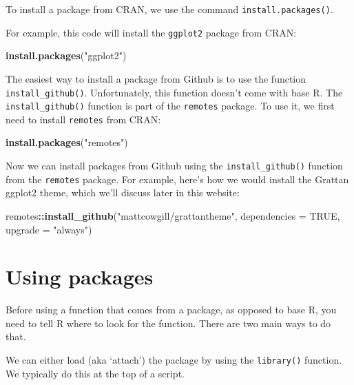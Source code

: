 \documentclass[]{book}
\newenvironment{Shaded}{\begin{snugshade}}{\end{snugshade}}
\newcommand{\DataTypeTok}[1]{\textcolor[rgb]{0.13,0.29,0.53}{#1}}
\newcommand{\KeywordTok}[1]{\textcolor[rgb]{0.13,0.29,0.53}{\textbf{#1}}}
\newcommand{\NormalTok}[1]{#1}
\newcommand{\OperatorTok}[1]{\textcolor[rgb]{0.81,0.36,0.00}{\textbf{#1}}}
\newcommand{\OtherTok}[1]{\textcolor[rgb]{0.56,0.35,0.01}{#1}}
\newcommand{\StringTok}[1]{\textcolor[rgb]{0.31,0.60,0.02}{#1}}
\begin{document}
To install a package from CRAN, we use the command \texttt{install.packages()}.

For example, this code will install the \texttt{ggplot2} package from CRAN:

\begin{Shaded}
\begin{Highlighting}[]
\KeywordTok{install.packages}\NormalTok{(}\StringTok{"ggplot2"}\NormalTok{)}
\end{Highlighting}
\end{Shaded}

The easiest way to install a package from Github is to use the function \texttt{install\_github()}. Unfortunately, this function doesn't come with base R. The \texttt{install\_github()} function is part of the \texttt{remotes} package. To use it, we first need to install \texttt{remotes} from CRAN:

\begin{Shaded}
\begin{Highlighting}[]
\KeywordTok{install.packages}\NormalTok{(}\StringTok{"remotes"}\NormalTok{)}
\end{Highlighting}
\end{Shaded}

Now we can install packages from Github using the \texttt{install\_github()} function from the \texttt{remotes} package. For example, here's how we would install the Grattan ggplot2 theme, which we'll discuss later in this website:

\begin{Shaded}
\begin{Highlighting}[]
\NormalTok{remotes}\OperatorTok{::}\KeywordTok{install_github}\NormalTok{(}\StringTok{"mattcowgill/grattantheme"}\NormalTok{, }\DataTypeTok{dependencies =} \OtherTok{TRUE}\NormalTok{, }\DataTypeTok{upgrade =} \StringTok{"always"}\NormalTok{)}
\end{Highlighting}
\end{Shaded}

\hypertarget{using-packages}{%
\section{Using packages}\label{using-packages}}

Before using a function that comes from a package, as opposed to base R, you need to tell R where to look for the function. There are two main ways to do that.

We can either load (aka `attach') the package by using the \texttt{library()} function. We typically do this at the top of a script.
\end{document}
